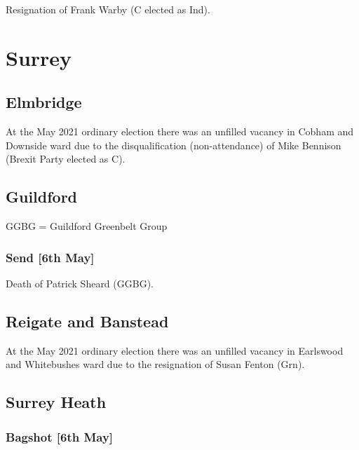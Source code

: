 \documentclass[a4paper,openany]{book}
\begin{document}
\begin{resultsiii}

Resignation of Frank Warby (C elected as Ind).

\section{Surrey}

\subsection*{Elmbridge}

At the May 2021 ordinary election there was an unfilled vacancy in Cobham and Downside ward due to the disqualification (non-attendance) of Mike Bennison (Brexit Party elected as C).

\subsection*{Guildford}

GGBG = Guildford Greenbelt Group

\subsubsection*{Send \hspace*{\fill}\nolinebreak[1]%
	\enspace\hspace*{\fill}
	[6th May]}


Death of Patrick Sheard (GGBG).

\subsection*{Reigate and Banstead}

At the May 2021 ordinary election there was an unfilled vacancy in Earlswood and Whitebushes ward due to the resignation of Susan Fenton (Grn).

\subsection*{Surrey Heath}

\subsubsection*{Bagshot \hspace*{\fill}\nolinebreak[1]%
	\enspace\hspace*{\fill}
	[6th May]}


\end{resultsiii}
\end{document}
